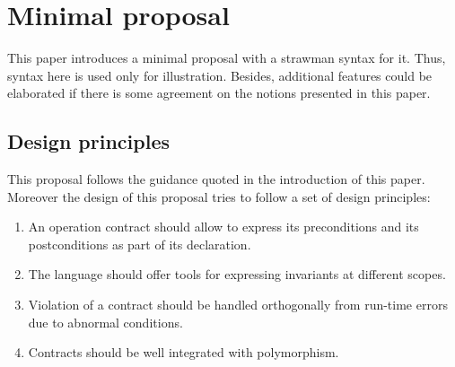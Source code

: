 \section{Minimal proposal}

This paper introduces a minimal proposal with a strawman syntax for it.
Thus, syntax here is used only for illustration. Besides, additional
features could be elaborated if there is some agreement on the notions
presented in this paper.

\subsection{Design principles}

This proposal follows the guidance quoted in the introduction of this paper.
Moreover the design of this proposal tries to follow a set of design principles:

\begin{enumerate}
\item An operation contract should allow to express its preconditions and its
postconditions as part of its declaration.
\item The language should offer tools for expressing invariants at different
scopes.
\item Violation of a contract should be handled orthogonally from run-time
errors due to abnormal conditions.
\item Contracts should be well integrated with polymorphism.
\end{enumerate}

